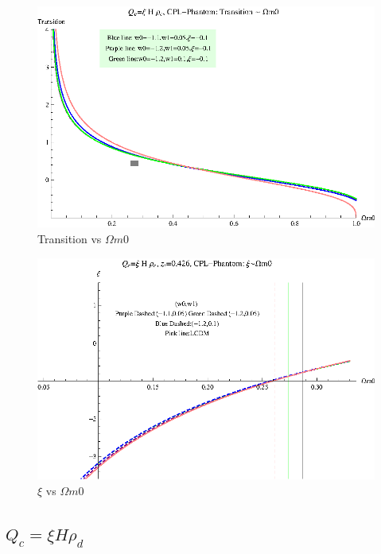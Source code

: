 \documentclass[12pt,a4paper]{article}
\begin{document}
\begin{figure}
\centering
\includegraphics[width=500pt]{rhoc_ICCPL_Phan_TransVSOmegam0.eps}
\caption{Transition vs $\Omega m0$}\label{fig-rhoc_ICCPL_Phan_TransVSOmegam0}
\end{figure}



\begin{figure}
\centering
\includegraphics[width=500pt]{rhoc_ICCPL_Phan_xiVSOmegam0.eps}
\caption{$\xi$ vs $\Omega m0$}\label{fig-rhoc_ICCPL_Phan_xiVSOmegam0}
\end{figure}










\subsection{$Q_c=\xi H \rho_d$}
\end{document}
